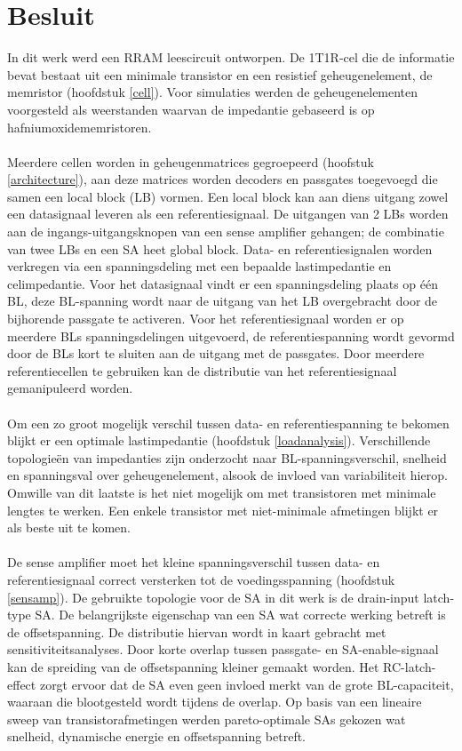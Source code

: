 \chapter{Besluit}
\label{besluit}
In dit werk werd een RRAM leescircuit ontworpen. De 1T1R-cel die de informatie bevat bestaat uit een minimale transistor en een resistief geheugenelement, de memristor (hoofdstuk \ref{cell}). Voor simulaties werden de geheugenelementen voorgesteld als weerstanden waarvan de impedantie gebaseerd is op hafniumoxidememristoren.\\\\
Meerdere cellen worden in geheugenmatrices gegroepeerd (hoofstuk \ref{architecture}), aan deze matrices worden decoders en passgates toegevoegd die samen een local block (LB) vormen. Een local block kan aan diens uitgang zowel een datasignaal leveren als een referentiesignaal. De uitgangen van 2 LBs worden aan de ingangs-uitgangsknopen van een sense amplifier gehangen; de combinatie van twee LBs en een SA heet global block. Data- en referentiesignalen worden verkregen via een spanningsdeling met een bepaalde lastimpedantie en celimpedantie. Voor het datasignaal vindt er een spanningsdeling plaats op één BL, deze BL-spanning wordt naar de uitgang van het LB overgebracht door de bijhorende passgate te activeren. Voor het referentiesignaal worden er op meerdere BLs spanningsdelingen uitgevoerd, de referentiespanning wordt gevormd door de BLs kort te sluiten aan de uitgang met de passgates. Door meerdere referentiecellen te gebruiken kan de distributie van het referentiesignaal gemanipuleerd worden.\\\\
Om een zo groot mogelijk verschil tussen data- en referentiespanning te bekomen blijkt er een optimale lastimpedantie (hoofdstuk \ref{loadanalysis}). Verschillende topologieën van impedanties zijn onderzocht naar BL-spanningsverschil, snelheid en spanningsval over geheugenelement, alsook de invloed van variabiliteit hierop. Omwille van dit laatste is het niet mogelijk om met transistoren met minimale lengtes te werken. Een enkele transistor met niet-minimale afmetingen blijkt er als beste uit te komen.\\\\
De sense amplifier moet het kleine spanningsverschil tussen data- en referentiesignaal correct versterken tot de voedingsspanning (hoofdstuk \ref{sensamp}). De gebruikte topologie voor de SA in dit werk is de drain-input latch-type SA. De belangrijkste eigenschap van een SA wat correcte werking betreft is de offsetspanning. De distributie hiervan wordt in kaart gebracht met sensitiviteitsanalyses. Door korte overlap tussen passgate- en SA-enable-signaal kan de spreiding van de offsetspanning kleiner gemaakt worden. Het RC-latch-effect zorgt ervoor dat de SA even geen invloed merkt van de grote BL-capaciteit, waaraan die blootgesteld wordt tijdens de overlap. Op basis van een lineaire sweep van transistorafmetingen werden  pareto-optimale SAs gekozen wat snelheid, dynamische energie en offsetspanning betreft.\\\\
